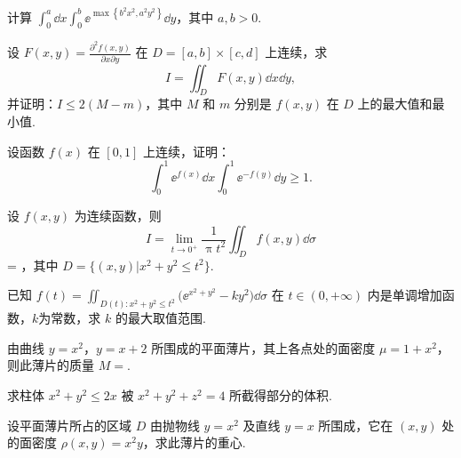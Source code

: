 	\begin{ti}
		计算 $\int_{0}^{a} \dd{x} \int_{0}^{b} \ee^{ \max\left\{ b^{2}x^{2}, a^{2}y^{2} \right\} } \dd{y}$，其中 $a,b > 0$.
	\end{ti}

	\begin{ti}
		设 $F(x,y) = \frac{\partial^{2}f(x,y)}{\partial x \partial y}$ 在 $D = [a,b] \times [c,d]$ 上连续，求
		\[
			I = \iint_{D} F(x,y) \dd{x} \dd{y},
		\]
		并证明：$I \leq 2(M - m)$，其中 $M$ 和 $m$ 分别是 $f(x,y)$ 在 $D$ 上的最大值和最小值.
	\end{ti}

	\begin{ti}
		设函数 $f(x)$ 在 $[0,1]$ 上连续，证明：
		\[
			\int_{0}^{1} \ee^{f(x)} \dd{x} \int_{0}^{1} \ee^{-f(y)} \dd{y} \geq 1.
		\]
	\end{ti}

	\begin{ti}
		设 $f(x,y)$ 为连续函数，则
		\[
			I = \lim_{t \to 0^{+}} \frac{1}{\uppi t^{2}} \iint_{D} f(x,y) \dd{\sigma}
		\] = \htwo，其中 $D = \bigl\{ (x,y) \bigl| x^{2} + y^{2} \leq t^{2} \bigr\}$.
	\end{ti}

	\begin{ti}
		已知 $f(t) = \iint_{D(t): x^{2} + y^{2} \leq t^{2}} \bigl( \ee^{x^{2} + y^{2}} - ky^{2} \bigr) \dd{\sigma}$ 在 $t \in (0,+\infty)$ 内是单调增加函数，$k$为常数，求 $k$ 的最大取值范围.
	\end{ti}

	\begin{ti}
		由曲线 $y = x^{2}$，$y = x + 2$ 所围成的平面薄片，其上各点处的面密度 $\mu = 1 + x^{2}$，则此薄片的质量 $M = $\htwo.
	\end{ti}

	\begin{ti}
		求柱体 $x^{2} + y^{2} \leq 2x$ 被 $x^{2} + y^{2} + z^{2} = 4$ 所截得部分的体积.
	\end{ti}

	\begin{ti}
		设平面薄片所占的区域 $D$ 由抛物线 $y = x^{2}$ 及直线 $y = x$ 所围成，它在 $(x,y)$ 处的面密度 $\rho(x,y) = x^{2}y$，求此薄片的重心.
	\end{ti}